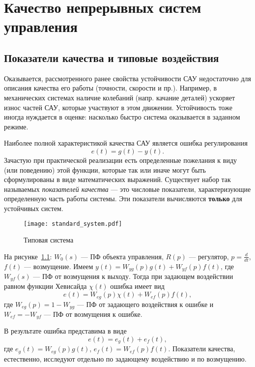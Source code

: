 \documentclass[../../TAU.tex]{subfiles}
\begin{document}
\chapter{Качество непрерывных систем управления}

\section{Показатели качества и типовые воздействия}

    Оказывается, рассмотренного ранее свойства устойчивости САУ недостаточно для описания качества его работы (точности, скорости и пр.). Например, в механических системах наличие колебаний (напр. качание деталей) ускоряет износ частей САУ, которые участвуют в этом движении. Устойчивость тоже иногда нуждается в оценке: насколько быстро система оказывается в заданном режиме.

    Наиболее полной характеристикой качества САУ является ошибка регулирования
    $$
        e(t) = g(t) - y(t).
    $$
    Зачастую при практической реализации есть определенные пожелания к виду (или поведению) этой функции, которые так или иначе могут быть сформулированы в виде математических выражений. Существует набор так называемых {\it показателей качества} --- это числовые показатели, характеризующие определенную часть работы системы. Эти показатели вычисляются {\bf только} для  устойчивых систем.
    \pagebreak

    \begin{figure}[h]
        \centering
        \texttt{[image: standard\_system.pdf]}
        \centering
        \caption{Типовая система}
        \label{FIG1}
    \end{figure}

    На рисунке~\ref{FIG1}: $W_0(s)$ --- ПФ объекта управления, $R(p)$ --- регулятор, $p=\frac{d}{dt}$, $f(t)$  --- возмущение.
    Имеем $y(t) = W_{yg}(p)g(t) + W_{yf}(p)f(t)$, где $W_{yf}(s)$ --- ПФ от возмущения к выходу. Тогда при задающем воздействии равном функции Хевисайда $\chi(t)$ ошибка имеет вид
    $$
    e(t) = W_{eg}(p) \chi(t) + W_{ef}(p) f(t),
    $$
    где $W_{eg}(p) = 1-W_{yg}$ --- ПФ от задающего воздействия к ошибке и ${W_{ef} = - W_{yf}}$ --- ПФ от возмущения к ошибке.

    В результате ошибка представима в виде
    $$
        e(t) = e_g(t) + e_f(t),
    $$
    где $e_g(t) = W_{eg}(p) g(t)$, $e_f(t) = W_{ef}(p) f(t)$. Показатели качества, естественно, исследуют отдельно по задающему воздействию и по возмущению.
\end{document}
